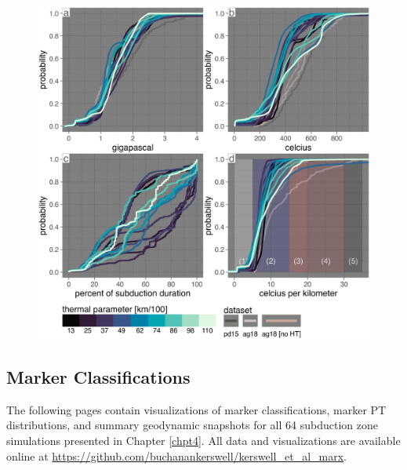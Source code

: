 \begin{figure}[htbp]

{\centering \includegraphics[width=1\linewidth,]{assets/figs/chpt4/phi_cdf} 

}

\end{figure}

\cleardoublepage

\hypertarget{vis}{%
\subsection{Marker Classifications}\label{vis}}

The following pages contain visualizations of marker classifications, marker PT distributions, and summary geodynamic snapshots for all 64 subduction zone simulations presented in Chapter \ref{chpt4}. All data and visualizations are available online at \url{https://github.com/buchanankerswell/kerswell_et_al_marx}.


